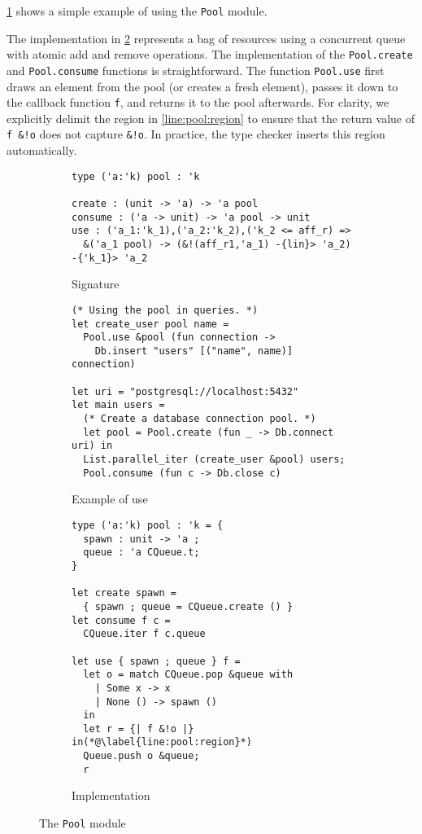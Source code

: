 \cref{ex:pool} shows a simple example of using the \lstinline/Pool/ module.

The implementation in \cref{impl:pool} represents a bag of resources
using a concurrent queue with atomic add and remove operations.
The implementation of the \lstinline/Pool.create/ and \lstinline/Pool.consume/
functions is straightforward.
The function \lstinline/Pool.use/ first draws
an element from the pool (or creates a fresh element),
passes it down to the callback function \lstinline/f/, and returns
it to the pool afterwards.
For clarity,
we explicitly delimit the region in \cref{line:pool:region} to ensure that
the return value of \lstinline/f &!o/ does not capture \lstinline/&!o/.
In practice, the type checker inserts this region automatically.

\begin{figure}[tp]
  \centering
  \begin{subfigure}[t]{1\linewidth}
\begin{lstlisting}
type ('a:'k) pool : 'k

create : (unit -> 'a) -> 'a pool
consume : ('a -> unit) -> 'a pool -> unit
use : ('a_1:'k_1),('a_2:'k_2),('k_2 <= aff_r) =>
  &('a_1 pool) -> (&!(aff_r1,'a_1) -{lin}> 'a_2) -{'k_1}> 'a_2
\end{lstlisting}
    \vspace{-10pt}
    \caption{Signature}
    \label{intf:pool}

\begin{lstlisting}
(* Using the pool in queries. *)
let create_user pool name =
  Pool.use &pool (fun connection ->
    Db.insert "users" [("name", name)] connection)

let uri = "postgresql://localhost:5432"
let main users =
  (* Create a database connection pool. *)
  let pool = Pool.create (fun _ -> Db.connect uri) in
  List.parallel_iter (create_user &pool) users;
  Pool.consume (fun c -> Db.close c)
\end{lstlisting}
    \vspace{-10pt}
    \caption{Example of use}
    \label{ex:pool}
  \end{subfigure}

  \begin{subfigure}[t]{1\linewidth}
\begin{lstlisting}
type ('a:'k) pool : 'k = {
  spawn : unit -> 'a ;
  queue : 'a CQueue.t;
}

let create spawn =
  { spawn ; queue = CQueue.create () }
let consume f c =
  CQueue.iter f c.queue

let use { spawn ; queue } f =
  let o = match CQueue.pop &queue with
    | Some x -> x
    | None () -> spawn ()
  in
  let r = {| f &!o |} in(*@\label{line:pool:region}*)
  Queue.push o &queue;
  r
\end{lstlisting}
    \vspace{-15pt}
    \caption{Implementation}
    \label{impl:pool}
  \end{subfigure}

  \caption{The \texttt{Pool} module}
  \label{fig:pool}
\end{figure}


